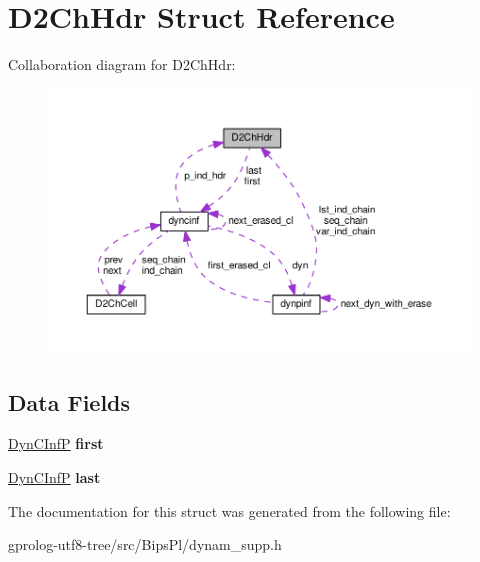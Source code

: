 \hypertarget{structD2ChHdr}{}\section{D2\+Ch\+Hdr Struct Reference}
\label{structD2ChHdr}


Collaboration diagram for D2\+Ch\+Hdr\+:\nopagebreak
\begin{figure}[H]
\begin{center}
\leavevmode
\includegraphics[width=350pt]{structD2ChHdr__coll__graph}
\end{center}
\end{figure}
\subsection*{Data Fields}
\begin{DoxyCompactItemize}
\item 
\hyperlink{structdyncinf}{Dyn\+C\+InfP} {\bfseries first}\hypertarget{structD2ChHdr_ac1ff1d6290dd45e018ee4097a2c2427d}{}\label{structD2ChHdr_ac1ff1d6290dd45e018ee4097a2c2427d}

\item 
\hyperlink{structdyncinf}{Dyn\+C\+InfP} {\bfseries last}\hypertarget{structD2ChHdr_a35d1cb0c22a72f9a49a6d26b9f8046c8}{}\label{structD2ChHdr_a35d1cb0c22a72f9a49a6d26b9f8046c8}

\end{DoxyCompactItemize}


The documentation for this struct was generated from the following file\+:\begin{DoxyCompactItemize}
\item 
gprolog-\/utf8-\/tree/src/\+Bips\+Pl/dynam\+\_\+supp.\+h\end{DoxyCompactItemize}
